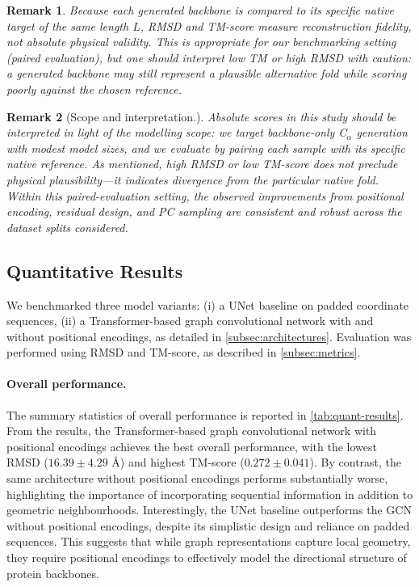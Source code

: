 \documentclass[a4paper,12pt]{article}
\newtheorem{remark}{Remark}[section]
\begin{document}
\begin{remark}
    Because each generated backbone is compared to its specific native target of the same length \(L\), RMSD and TM-score measure reconstruction fidelity, not absolute physical validity. This is appropriate for our benchmarking setting (paired evaluation), but one should interpret low TM or high RMSD with caution: a generated backbone may still represent a plausible alternative fold while scoring poorly against the chosen reference.
\end{remark}
\begin{remark}[Scope and interpretation.]
    Absolute scores in this study should be interpreted in light of the modelling scope: we target backbone-only C\(_\alpha\) generation with modest model sizes, and we evaluate by pairing each sample with its specific native reference. As mentioned, high RMSD or low TM-score does not preclude physical plausibility—it indicates divergence from the particular native fold. Within this paired-evaluation setting, the observed improvements from positional encoding, residual design, and PC sampling are consistent and robust across the dataset splits considered.
\end{remark}

\subsection{Quantitative Results}\label{subsec:results}
We benchmarked three model variants: (i) a UNet baseline on padded coordinate 
sequences, (ii) a Transformer-based graph convolutional network with and without positional 
encodings, as detailed in \cref{subsec:architectures}. Evaluation was performed using RMSD and TM-score, as described in \cref{subsec:metrics}.

\paragraph{Overall performance.}
The summary statistics of overall performance is reported in \cref{tab:quant-results}. From the results, the Transformer-based graph convolutional network with positional encodings achieves the best overall performance, with the lowest RMSD (\(16.39 \pm 4.29\) \AA) and highest TM-score (\(0.272 \pm 0.041\)). By contrast, the same architecture without positional encodings performs substantially worse, highlighting the importance of incorporating sequential information in addition to geometric neighbourhoods. Interestingly, the UNet baseline outperforms the GCN without positional encodings, despite its simplistic design and reliance on padded sequences. This suggests that while graph representations capture local geometry, they require positional encodings to effectively model the directional structure of protein backbones.
\end{document}
